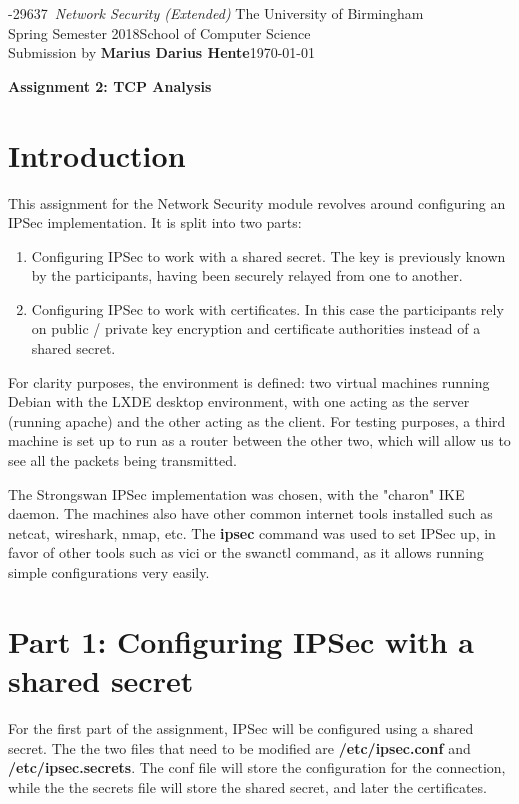 \documentclass[10pt]{article}\usepackage[]{graphicx}\usepackage[]{color}
\newcommand{\bannercode}{06-29637}
\newcommand{\coursetitle}{Network Security (Extended)}
\newcommand{\Year}{2018}
\newcommand{\Season}{Spring}
\newcommand{\MyName}{Marius Darius Hente}
\begin{document}
{\large\noindent\bannercode\ \emph{\coursetitle} \hfill The University of Birmingham\\
    \Season{} Semester \Year \hfill School of Computer Science\\
    Submission by \textbf{\MyName}\hfill\today}


%
%

\begin{center}
      \Large\textbf{Assignment 2: TCP Analysis}\\
\end{center}

\section{Introduction}
This assignment for the Network Security module revolves around configuring an IPSec implementation. It is split into two parts:
\begin{enumerate}
	\item Configuring IPSec to work with a shared secret. The key is previously known by the participants, having been securely relayed from one to another.
	\item Configuring IPSec to work with certificates. In this case the participants rely on public / private key encryption and certificate authorities instead of a shared secret.
\end{enumerate}

For clarity purposes, the environment is defined: two virtual machines running Debian with the LXDE desktop environment, with one acting as the server (running apache) and the other acting as the client. For testing purposes, a third machine is set up to run as a router between the other two, which will allow us to see all the packets being transmitted.

The Strongswan IPSec implementation was chosen, with the "charon" IKE daemon. The machines also have other common internet tools installed such as netcat, wireshark, nmap, etc. The \textbf{ipsec} command was used to set IPSec up, in favor of other tools such as vici or the swanctl command, as it allows running simple configurations very easily.

\section{Part 1: Configuring IPSec with a shared secret}
For the first part of the assignment, IPSec will be configured using a shared secret. The the two files that need to be modified are \textbf{/etc/ipsec.conf} and \textbf{/etc/ipsec.secrets}. The conf file will store the configuration for the connection, while the the secrets file will store the shared secret, and later the certificates.
\end{document}
